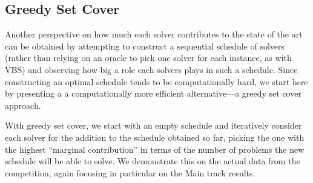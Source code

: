 \documentclass{elsarticle}
\begin{document}
\subsection{Greedy Set Cover}
Another perspective on how much each solver contributes to the state of the art
can be obtained by attempting to construct a sequential schedule of solvers 
(rather than relying on an oracle to pick one solver for each instance, as with VBS)
and observing how big a role each solvers plays in such a schedule. Since constructing 
an optimal schedule tends to be computationally hard, we start here by 
presenting a a computationally more efficient alternative---a greedy set cover approach.

With greedy set cover, we start with an empty schedule and iteratively consider 
each solver for the addition to the schedule obtained so far, picking the one
with the highest ``marginal contribution'' in terms of the number of problems
the new schedule will be able to solve. We demonstrate this on
the actual data from the competition, again focusing in particular on the Main track results. 
\end{document}
